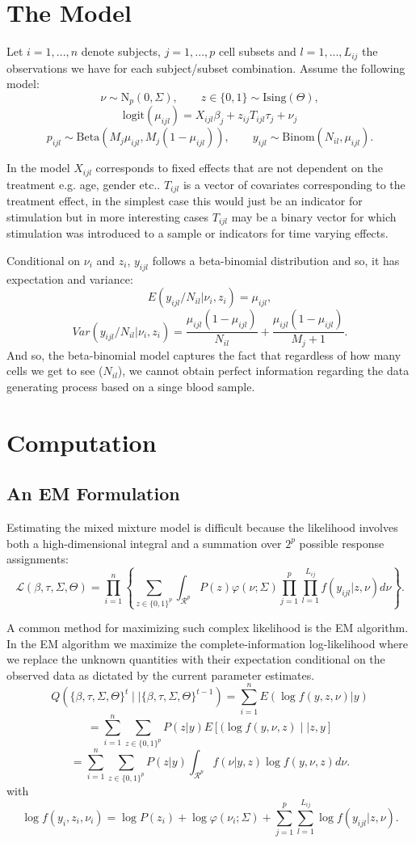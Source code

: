 \documentclass{article}
\begin{document}
\section{The Model}
Let $i=1,...,n$ denote subjects, $j=1,...,p$ cell subsets and $l=1,...,L_{ij}$ the observations we have for each subject/subset combination. Assume the following model:
$$
\nu \sim \text{N}_p(0, \Sigma), \qquad z\in\{0, 1\} \sim \text{Ising}(\Theta),
$$$$
\text{logit}(\mu_{ijl}) = X_{ijl}\beta_{j} + z_{ij} T_{ijl} \tau_{j} + \nu_j
$$$$
p_{ijl} \sim \text{Beta}(M_j\mu_{ijl},M_j(1 - \mu_{ijl})), \qquad
y_{ijl} \sim \text{Binom}(N_{il}, \mu_{ijl}).
$$

In the model $X_{ijl}$ corresponds to fixed effects that are not dependent on the treatment e.g. age, gender etc.. $T_{ijl}$ is a vector of covariates corresponding to the treatment effect, in the simplest case this would just be an indicator for stimulation but in more interesting cases $T_{ijl}$ may be a binary vector for which stimulation was introduced to a sample or indicators for time varying effects. 

Conditional on $\nu_i$ and $z_i$, $y_{ijl}$ follows a beta-binomial distribution and so, it has expectation and variance:
$$ 
E(y_{ijl} / N_{il} | \nu_i, z_i) = \mu_{ijl}, 
$$$$
Var(y_{ijl} / N_{il}| \nu_i, z_i) = \frac{\mu_{ijl}(1 - \mu_{ijl})}{N_{il}} + \frac{\mu_{ijl}(1 - \mu_{ijl})}{M_j + 1}.
$$
And so, the beta-binomial model captures the fact that regardless of how many cells we get to see ($N_{il}$), we cannot obtain perfect information regarding the data generating process based on a singe blood sample.  



\section{Computation}
\subsection{An EM Formulation}
Estimating the mixed mixture model is difficult because the likelihood involves both a high-dimensional integral and a summation over $2^{p}$ possible response assignments:
$$
\mathcal{L}(\beta,\tau,\Sigma,\Theta) = \prod_{i=1}^{n}\left\{
\sum_{z\in\{0,1\}^{p}}\int_{\mathcal{R}^{p}}P(z)\varphi(\nu ; \Sigma) 
\prod_{j=1}^{p}\prod_{l=1}^{L_{ij}} f(y_{ijl}|z,\nu)d\nu 
\right\}.
$$

A common method for maximizing such complex likelihood is the EM algorithm. In the EM algorithm we maximize the complete-information log-likelihood where we replace the unknown quantities with their expectation conditional on the observed data as dictated by the current parameter estimates. 
$$
Q\left(\{\beta,\tau,\Sigma,\Theta\}^{t} \mid| \{\beta,\tau,\Sigma,\Theta\}^{t-1}
\right) =\sum_{i=1}^{n} E(\log f(y, z, \nu) | y)
$$$$
= \sum_{i=1}^{n}\sum_{z\in\{0,1\}^{p}}P(z|y) E\left[(\log f(y,\nu, z) \mid| z, y \right]
$$$$
= \sum_{i=1}^{n}\sum_{z\in\{0,1\}^{p}}P(z|y) \int_{\mathcal{R}^{p}} f(\nu | y, z) \log f(y, \nu, z) d\nu.
$$
with
$$
\log f(y_i, z_i, \nu_i) = \log P(z_i) + \log \varphi(\nu_i ; \Sigma) + \sum_{j=1}^{p}\sum_{l=1}^{L_{ij}}
\log f(y_{ijl} | z, \nu).
$$
\end{document}
